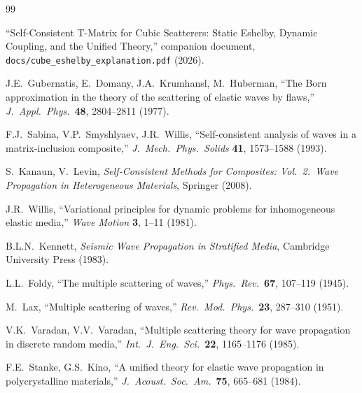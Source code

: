 \documentclass[11pt,a4paper]{article}
\begin{document}
\begin{thebibliography}{99}

``Self-Consistent T-Matrix for Cubic Scatterers:
Static Eshelby, Dynamic Coupling, and the Unified Theory,''
companion document, \texttt{docs/cube\_eshelby\_explanation.pdf} (2026).

J.E.\ Gubernatis, E.\ Domany, J.A.\ Krumhansl, M.\ Huberman,
``The Born approximation in the theory of the scattering of elastic
waves by flaws,''
\emph{J.\ Appl.\ Phys.}\ \textbf{48}, 2804--2811 (1977).

F.J.\ Sabina, V.P.\ Smyshlyaev, J.R.\ Willis,
``Self-consistent analysis of waves in a matrix-inclusion composite,''
\emph{J.\ Mech.\ Phys.\ Solids} \textbf{41}, 1573--1588 (1993).

S.\ Kanaun, V.\ Levin,
\emph{Self-Consistent Methods for Composites: Vol.~2.\ Wave
Propagation in Heterogeneous Materials},
Springer (2008).

J.R.\ Willis,
``Variational principles for dynamic problems for inhomogeneous
elastic media,''
\emph{Wave Motion} \textbf{3}, 1--11 (1981).

B.L.N.\ Kennett,
\emph{Seismic Wave Propagation in Stratified Media},
Cambridge University Press (1983).

L.L.\ Foldy,
``The multiple scattering of waves,''
\emph{Phys.\ Rev.}\ \textbf{67}, 107--119 (1945).

M.\ Lax,
``Multiple scattering of waves,''
\emph{Rev.\ Mod.\ Phys.}\ \textbf{23}, 287--310 (1951).

V.K.\ Varadan, V.V.\ Varadan,
``Multiple scattering theory for wave propagation in discrete random
media,''
\emph{Int.\ J.\ Eng.\ Sci.}\ \textbf{22}, 1165--1176 (1985).

F.E.\ Stanke, G.S.\ Kino,
``A unified theory for elastic wave propagation in polycrystalline
materials,''
\emph{J.\ Acoust.\ Soc.\ Am.}\ \textbf{75}, 665--681 (1984).

\end{thebibliography}
\end{document}
